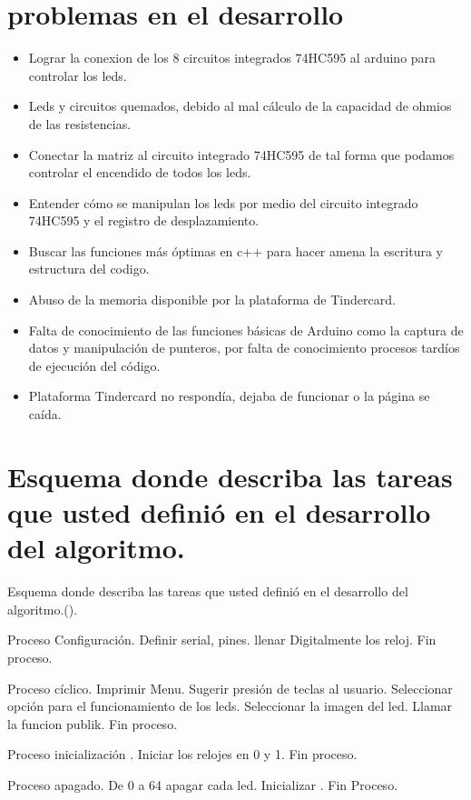 \documentclass{article}
\begin{document}
\section{ problemas en el desarrollo }

\begin{itemize}
\item Lograr la conexion de los 8 circuitos integrados 74HC595 al arduino para controlar los leds.
\item Leds y circuitos quemados, debido al mal cálculo de la capacidad de ohmios de las resistencias.
\item Conectar la matriz al circuito integrado 74HC595 de tal forma que podamos controlar el encendido de todos los leds.
\item Entender cómo se manipulan los leds por medio del circuito integrado 74HC595 y el registro de desplazamiento.
\item Buscar las funciones más óptimas en c++ para hacer amena la escritura y estructura del codigo.
\item Abuso de la memoria disponible por la plataforma de Tindercard.
\item Falta de conocimiento de las funciones básicas de Arduino como la captura de datos y manipulación de punteros, por falta de conocimiento procesos tardíos de ejecución del código.
\item Plataforma Tindercard no respondía, dejaba de funcionar o la página se caída.



\end{itemize}

\section{Esquema donde describa las tareas que usted definió en el desarrollo del algoritmo.
}
Esquema donde describa las tareas que usted definió en el desarrollo del algoritmo.().

Proceso Configuración.
Definir serial, pines.
llenar Digitalmente los reloj.
Fin proceso.

Proceso cíclico. 
Imprimir Menu.
Sugerir presión de teclas al usuario.
Seleccionar opción para el funcionamiento de los leds.
Seleccionar la imagen del led.
Llamar la funcion publik.
Fin proceso.

Proceso inicialización .
Iniciar los relojes en 0 y 1. 
Fin proceso.

Proceso apagado.
De 0 a 64 apagar cada led. 
Inicializar .
Fin Proceso.
\end{document}

